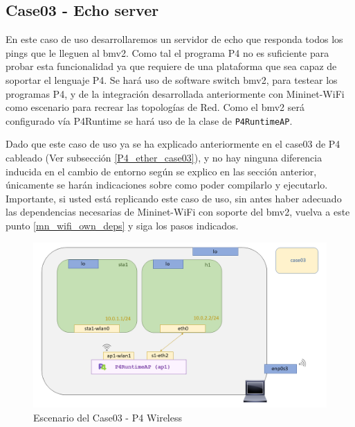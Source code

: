 \subsection{Case03 - Echo server}
\label{p4_wifi_case03}

 En este caso de uso desarrollaremos un servidor de echo que responda todos los pings que le lleguen al \gls{bmv2}. Como tal el programa P4 no es suficiente para probar esta funcionalidad ya que requiere de una plataforma que sea capaz de soportar el lenguaje P4. Se hará uso de software switch \gls{bmv2}, para testear los programas P4, y de la integración desarrollada anteriormente con Mininet-WiFi como escenario para recrear las topologías de Red. Como el \gls{bmv2} será configurado vía P4Runtime se hará uso de la clase de \texttt{P4RuntimeAP}.\\
\par

Dado que este caso de uso ya se ha explicado anteriormente en el case03 de P4 cableado (Ver subsección \ref{P4_ether_case03}), y no hay ninguna diferencia inducida en el cambio de entorno según se explico en las sección anterior,  únicamente se harán indicaciones sobre como poder compilarlo y ejecutarlo. Importante, si usted está replicando este caso de uso, sin antes haber adecuado las dependencias necesarias de Mininet-WiFi con soporte del \gls{bmv2}, vuelva a este punto \ref{mn_wifi_own_deps} y siga los pasos indicados.\\
\par

\begin{figure}[ht]
    \centering
    \includegraphics[width=16cm]{archivos/img/dev/p4-wifi/case03/scenario.png}
    \caption{Escenario del Case03 - P4 Wireless}
    \label{fig:case03_p4_wifi_scenario}
\end{figure}

